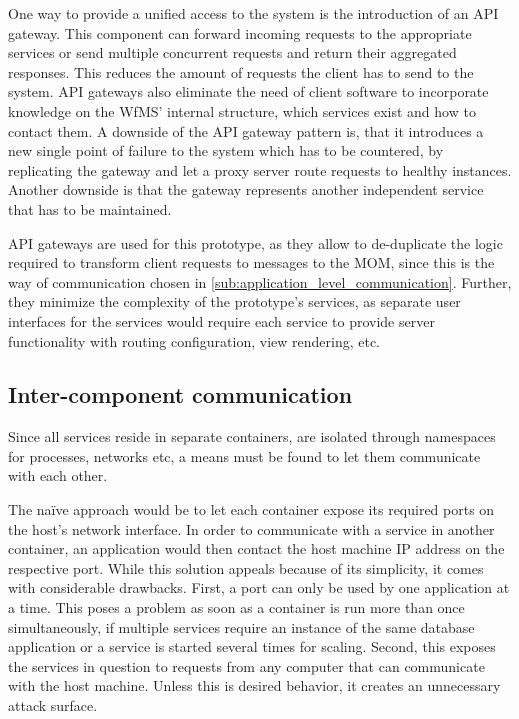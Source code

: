   One way to provide a unified access to the system is the introduction of an \ac{API} gateway.
  This component can forward incoming requests to the appropriate services or send multiple concurrent requests and return their aggregated responses. This reduces the amount of requests the client has to send to the system. \ac{API} gateways also eliminate the need of client software to incorporate knowledge on the \ac{WfMS}' internal structure, \eg which services exist and how to contact them.
  A downside of the \ac{API} gateway pattern is, that it introduces a new single point of failure to the system which has to be countered, \eg by replicating the gateway and let a proxy server route requests to healthy instances. Another downside is that the gateway represents another independent service that has to be maintained.

  \ac{API} gateways are used for this prototype, as they allow to de-duplicate the logic required to transform client requests to messages to the \ac{MOM}, since this is the way of communication chosen in \ref{sub:application_level_communication}. Further, they minimize the complexity of the prototype's services, as separate user interfaces for the services would require each service to provide server functionality with routing configuration, view rendering, etc.
\subsection{Inter-component communication} %
\label{sub:inter_component_communication}

  Since all services reside in separate containers, \ie are isolated through namespaces for processes, networks etc, a means must be found to let them communicate with each other.

  The naïve approach would be to let each container expose its required ports on the host's network interface. In order to communicate with a service in another container, an application would then contact the host machine \ac{IP} address on the respective port. While this solution appeals because of its simplicity, it comes with considerable drawbacks.
  First, a port can only be used by one application at a time. This poses a problem as soon as a container is run more than once simultaneously, \eg if multiple services require an instance of the same database application or a service is started several times for scaling.
  Second, this exposes the services in question to requests from any computer that can communicate with the host machine. Unless this is desired behavior, it creates an unnecessary attack surface.

